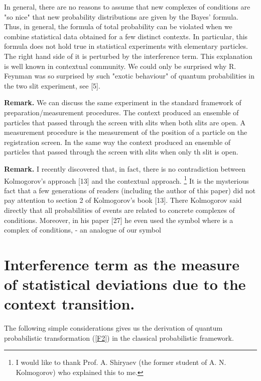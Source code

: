 \documentclass[12pt,oneside,final,a4paper]{article}
\begin{document}
\coordHE{}

In general, there are no reasons to assume that new complexes of conditions \coordHE{}
are "so nice" that new probability distributions are given by the Bayes' formula.
Thus, in general, the formula of total probability can be violated
when we combine statistical data obtained for a few distinct contexts.
In particular,
this formula does not hold true in statistical experiments with elementary particles.
The right hand side of it is perturbed by the interference term. This  explanation
is well known in contextual community.  We could only be surprised why R. Feynman 
was so surprised by such "exotic behaviour" of quantum probabilities in the two
slit experiment, see [5]. 

{\bf Remark.} {\small We can discuss the same experiment in the standard framework of 
preparation/measurement procedures. The context \coordHE{} produced an ensemble of 
particles \coordHE{} that passed through the screen with slits  when both slits are open. A measurement 
procedure is the measurement of the position of a particle on the registration screen.
In the same way the context \coordHE{} produced an ensemble of 
particles \coordHE{} that passed through the screen with slits when only \coordHE{}th slit is open.}

{\bf Remark.}  {\small  I recently discovered that, in fact, there is no contradiction 
between Kolmogorov's approach [13] and the contextual approach.
\footnote{I would like to thank Prof. A. Shiryaev (the former student of A. N. Kolmogorov) who explained this to me.}
It is the mysterious fact that a few generations of readers (including the author of this paper) 
did not pay attention to section 2 of Kolmogorov's book [13]. There Kolmogorov said directly 
that all probabilities of events are related to concrete complexes of conditions. Moreover, in his 
paper [27] he even used the symbol \coordHE{} where \coordHE{} is a complex of conditions,
- an analogue of our symbol \coordHE{}}

\section{Interference term as the measure of statistical deviations due to the context transition.}
The following simple considerations gives us the derivation of 
quantum probabilistic transformation (\ref{F2}) in the 
classical probabilistic framework.  
\end{document}
